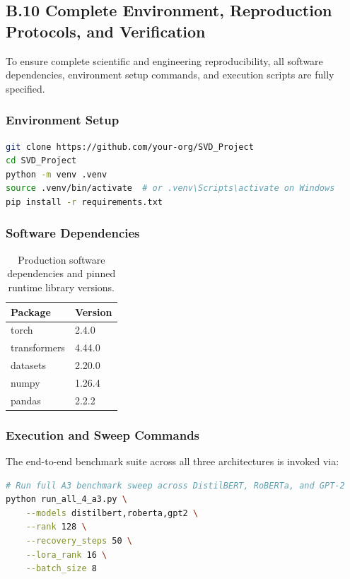 \subsection{B.10 Complete Environment, Reproduction Protocols, and Verification}
\label{sec:app_full_reproduction}

To ensure complete scientific and engineering reproducibility, all software dependencies, environment setup commands, and execution scripts are fully specified.

\subsubsection{Environment Setup}

\begin{lstlisting}[language=bash]
git clone https://github.com/your-org/SVD_Project
cd SVD_Project
python -m venv .venv
source .venv/bin/activate  # or .venv\Scripts\activate on Windows
pip install -r requirements.txt
\end{lstlisting}

\subsubsection{Software Dependencies}

\begin{table}[H]
\centering
\small
\begin{tabular}{ll}
\toprule
\textbf{Package} & \textbf{Version} \\
\midrule
torch & 2.4.0 \\
transformers & 4.44.0 \\
datasets & 2.20.0 \\
numpy & 1.26.4 \\
pandas & 2.2.2 \\
\bottomrule
\end{tabular}
\caption{Production software dependencies and pinned runtime library versions.}
\label{tab:app_dependencies}
\end{table}

\subsubsection{Execution and Sweep Commands}

The end-to-end benchmark suite across all three architectures is invoked via:

\begin{lstlisting}[language=bash]
# Run full A3 benchmark sweep across DistilBERT, RoBERTa, and GPT-2
python run_all_4_a3.py \
    --models distilbert,roberta,gpt2 \
    --rank 128 \
    --recovery_steps 50 \
    --lora_rank 16 \
    --batch_size 8
\end{lstlisting}


